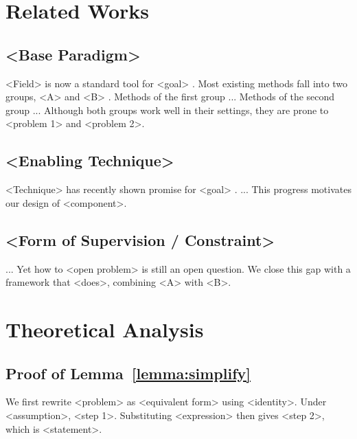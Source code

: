 \appendix
\clearpage
\section{Related Works} \label{apdx:related-works}
\subsection{<Base Paradigm>}
<Field> is now a standard tool for <goal> \citep{Placeholder-A}. Most existing methods fall into two groups, <A> \citep{Placeholder-B} and <B> \citep{Placeholder-C}. Methods of the first group ... Methods of the second group ... Although both groups work well in their settings, they are prone to <problem 1> and <problem 2>.

\subsection{<Enabling Technique>}
<Technique> has recently shown promise for <goal> \citep{Placeholder-A, Placeholder-B}. ... This progress motivates our design of <component>.

\subsection{<Form of Supervision / Constraint>}
... Yet how to <open problem> is still an open question. We close this gap with a framework that <does>, combining <A> with <B>.

\clearpage
\section{Theoretical Analysis} \label{apdx:theory}
\subsection{Proof of Lemma~\ref{lemma:simplify}} \label{apdx:proof-lemma}
We first rewrite <problem> as <equivalent form> using <identity>. Under <assumption>, <step 1>. Substituting <expression> then gives <step 2>, which is <statement>.

